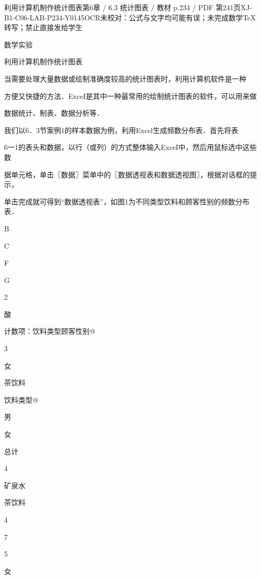 \begin{bankitem}{利用计算机制作统计图表}{第6章 / 6.3 统计图表 / 教材 p.234 / PDF 第241页}{XJ-B1-C06-LAB-P234-Y0145}{OCR未校对：公式与文字均可能有误；未完成数学TeX转写；禁止直接发给学生}
\begin{ocrdraft}
\par
数学实验
\par
利用计算机制作统计图表
\par
当需要处理大量数据或绘制准确度较高的统计图表时，利用计算机软件是一种
\par
方便又快捷的方法．ExceI是其中一种最常用的绘制统计图表的软件，可以用来做
\par
数据统计、制表、数据分析等．
\par
我们以6．3节案例1的样本数据为例，利用Excel生成频数分布表．首先将表
\par
6一1的表头和数据，以行（或列）的方式整体输入ExceI中，然后用鼠标选中这些数
\par
据单元格，单击〖数据〗菜单中的〖数据透视表和数据透视图〗，根据对话框的提示，
\par
单击完成就可得到“数据透视表”，如图1为不同类型饮料和顾客性别的频数分布表．
\par
B
\par
C
\par
F
\par
G
\par
2
\par
酸
\par
计数项：饮料类型顾客性别@
\par
3
\par
女
\par
茶饮料
\par
饮料类型@
\par
男
\par
女
\par
总计
\par
4
\par
矿泉水
\par
茶饮料
\par
4
\par
7
\par
5
\par
女
\par

\end{ocrdraft}
\end{bankitem}

